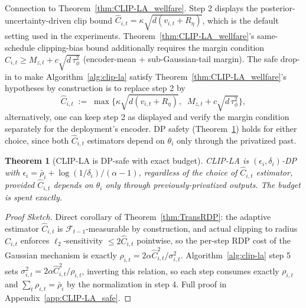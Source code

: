 \documentclass{article}
\newtheorem{theorem}{Theorem}
\begin{document}
Connection to Theorem~\ref{thm:CLIP-LA_wellfare}. Step 2 displays the posterior-uncertainty-driven clip bound $\hat C_{i,t} = \kappa\sqrt{d(v_{i,t}+R_\eta)}$, which is the default setting used in the experiments. Theorem~\ref{thm:CLIP-LA_wellfare}'s same-schedule clipping-bias bound additionally requires the margin condition $\hat C_{i,t} \ge M_{z,t} + c\sqrt{d\,\tau_\phi^2}$ (encoder-mean + sub-Gaussian-tail margin). The safe drop-in to make Algorithm~\ref{alg:clip-la}  satisfy Theorem~\ref{thm:CLIP-LA_wellfare}'s hypotheses by construction is to replace step 2 by
$$\hat C_{i,t} \;:=\; \max\!\Big\{\kappa\sqrt{d(v_{i,t}+R_\eta)},\;\; M_{z,t} + c\sqrt{d\,\tau_\phi^2}\Big\},$$ 
alternatively, one can keep step 2 as displayed and verify the margin condition separately for the deployment's encoder. DP safety (Theorem~\ref{thm:CLIP-LA_safe}) holds for either choice, since both $\hat C_{i,t}$ estimators depend on $\theta_i$ only through the privatized past.

\begin{theorem}[CLIP-LA is DP-safe with exact budget]
\label{thm:CLIP-LA_safe}
    CLIP-LA is $(\epsilon_i, \delta_i)$-DP with $\epsilon_i = \bar\rho_i + \log(1/\delta_i)/(\alpha-1)$, regardless of the choice of $\hat{C}_{i,t}$ estimator, provided $\hat{C}_{i,t}$ depends on $\theta_i$ only through previously-privatized outputs. The budget is spent exactly.
\end{theorem}

\begin{proof}
    [Proof Sketch]
    Direct corollary of Theorem~\ref{thm:TransRDP}: the adaptive estimator $\hat{C}_{i,t}$ is $\mathcal{F}_{t-1}$-measurable by construction, and actual clipping to radius $\hat C_{i,t}$ enforces $\ell_2$-sensitivity $\le 2\hat C_{i,t}$ pointwise, so the per-step RDP cost of the Gaussian mechanism is exactly $\rho_{i,t} = 2\alpha\hat C_{i,t}^2/\sigma_{i,t}^2$. Algorithm~\ref{alg:clip-la}  step 5 sets $\sigma_{i,t}^2 = 2\alpha\hat C_{i,t}^2/\rho_{i,t}$, inverting this relation, so each step consumes exactly $\rho_{i,t}$ and $\sum_t \rho_{i,t} = \bar\rho_i$ by the normalization in step 4. Full proof in Appendix~\ref{app:CLIP-LA_safe}.
\end{proof}
\end{document}
